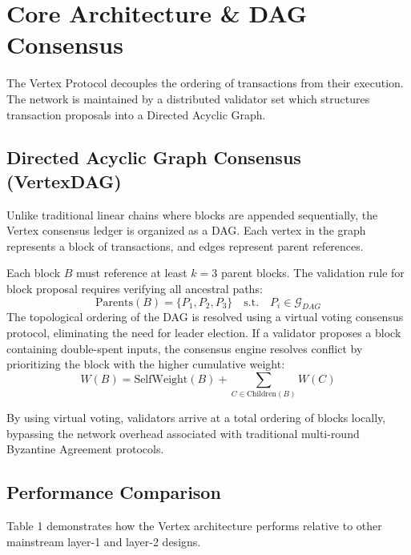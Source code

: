 \section{Core Architecture \& DAG Consensus}
The Vertex Protocol decouples the ordering of transactions from their execution. The network is maintained by a distributed validator set which structures transaction proposals into a Directed Acyclic Graph.

\subsection{Directed Acyclic Graph Consensus (VertexDAG)}
Unlike traditional linear chains where blocks are appended sequentially, the Vertex consensus ledger is organized as a DAG. Each vertex in the graph represents a block of transactions, and edges represent parent references.

Each block $B$ must reference at least $k = 3$ parent blocks. The validation rule for block proposal requires verifying all ancestral paths:
\begin{equation}
\text{Parents}(B) = \{P_1, P_2, P_3\} \quad \text{s.t.} \quad P_i \in \mathcal{G}_{DAG}
\end{equation}
The topological ordering of the DAG is resolved using a virtual voting consensus protocol, eliminating the need for leader election. If a validator proposes a block containing double-spent inputs, the consensus engine resolves conflict by prioritizing the block with the higher cumulative weight:
\begin{equation}
W(B) = \text{SelfWeight}(B) + \sum_{C \in \text{Children}(B)} W(C)
\end{equation}

By using virtual voting, validators arrive at a total ordering of blocks locally, bypassing the network overhead associated with traditional multi-round Byzantine Agreement protocols.

\subsection{Performance Comparison}
Table 1 demonstrates how the Vertex architecture performs relative to other mainstream layer-1 and layer-2 designs.

